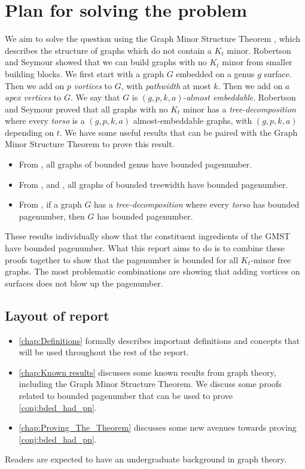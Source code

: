 \section{Plan for solving the problem}
We aim to solve the question using the Graph Minor Structure Theorem \cite{robertsonGraphMinorsXVI2003}, which describes the structure of graphs which do not contain a \(K_t\) minor.
Robertson and Seymour showed that we can build graphs with no \(K_t\) minor from smaller building blocks. We first start with a graph \(G\) embedded on a genus \(g\) surface. Then we add on \(p\) \textit{vortices} to \(G\), with \textit{pathwidth} at most \(k\). Then we add on \(a\) \textit{apex vertices} to \(G\). We say that \(G\) is \((g, p, k, a)\)-\textit{almost embeddable}. Robertson and Seymour \cite{robertsonGraphMinorsXVI2003} proved that all graphs with no \(K_t\) minor has a \textit{tree-decomposition} where every \textit{torso} is a \((g, p, k, a)\) almost-embeddable graphs, with \((g, p, k, a)\) depending on \(t\).
We have some useful results that can be paired with the Graph Minor Structure Theorem to prove this result.
\begin{itemize}
	\item From \textcite{heathPagenumberGenusGraphs1992}, all graphs of bounded genus have bounded pagenumber.
	\item From \textcite{ganleyPagenumberTrees2001}, and \textcite{dujmovicGraphTreewidthGeometric2007}, all graphs of bounded treewidth have bounded pagenumber.
	\item From \textcite{hickingbothamStackNumberCliqueSum2023}, if a graph \(G\) has a \textit{tree-decomposition} where every \textit{torso} has bounded pagenumber, then \(G\) has bounded pagenumber.
\end{itemize}
These results individually show that the constituent ingredients of the GMST have bounded pagenumber. What this report aims to do is to combine these proofs together to show that the pagenumber is bounded for all $K_t$-minor free graphs.
The most problematic combinations are showing that adding vortices on surfaces does not blow up the pagenumber. 
\subsection{Layout of report}
\begin{itemize}
	\item \cref{chap:Definitions} formally describes important definitions and concepts that will be used throughout the rest of the report.
	\item \cref{chap:Known results} discusses some known results from graph theory, including the Graph Minor Structure Theorem. We discuss some proofs related to bounded pagenumber that can be used to prove \cref{conj:bded_had_pn}.

	\item \cref{chap:Proving_The_Theorem} discusses some new avenues towards proving \cref{conj:bded_had_pn}.
\end{itemize}
Readers are expected to have an undergraduate background in graph theory.
